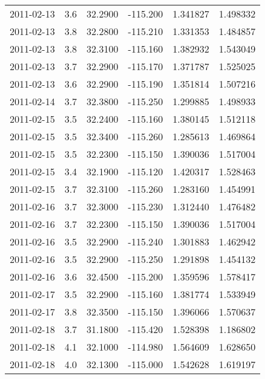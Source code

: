 \begin{tabular}{lrrrrr}
2011-02-13 &       3.6 &  32.2900 &  -115.200 &         1.341827 &         1.498332 \\
2011-02-13 &       3.8 &  32.2800 &  -115.210 &         1.331353 &         1.484857 \\
2011-02-13 &       3.8 &  32.3100 &  -115.160 &         1.382932 &         1.543049 \\
2011-02-13 &       3.7 &  32.2900 &  -115.170 &         1.371787 &         1.525025 \\
2011-02-13 &       3.6 &  32.2900 &  -115.190 &         1.351814 &         1.507216 \\
2011-02-14 &       3.7 &  32.3800 &  -115.250 &         1.299885 &         1.498933 \\
2011-02-15 &       3.5 &  32.2400 &  -115.160 &         1.380145 &         1.512118 \\
2011-02-15 &       3.5 &  32.3400 &  -115.260 &         1.285613 &         1.469864 \\
2011-02-15 &       3.5 &  32.2300 &  -115.150 &         1.390036 &         1.517004 \\
2011-02-15 &       3.4 &  32.1900 &  -115.120 &         1.420317 &         1.528463 \\
2011-02-15 &       3.7 &  32.3100 &  -115.260 &         1.283160 &         1.454991 \\
2011-02-16 &       3.7 &  32.3000 &  -115.230 &         1.312440 &         1.476482 \\
2011-02-16 &       3.7 &  32.2300 &  -115.150 &         1.390036 &         1.517004 \\
2011-02-16 &       3.5 &  32.2900 &  -115.240 &         1.301883 &         1.462942 \\
2011-02-16 &       3.5 &  32.2900 &  -115.250 &         1.291898 &         1.454132 \\
2011-02-16 &       3.6 &  32.4500 &  -115.200 &         1.359596 &         1.578417 \\
2011-02-17 &       3.5 &  32.2900 &  -115.160 &         1.381774 &         1.533949 \\
2011-02-17 &       3.8 &  32.3500 &  -115.150 &         1.396066 &         1.570637 \\
2011-02-18 &       3.7 &  31.1800 &  -115.420 &         1.528398 &         1.186802 \\
2011-02-18 &       4.1 &  32.1000 &  -114.980 &         1.564609 &         1.628650 \\
2011-02-18 &       4.0 &  32.1300 &  -115.000 &         1.542628 &         1.619197 \\

\end{tabular}
